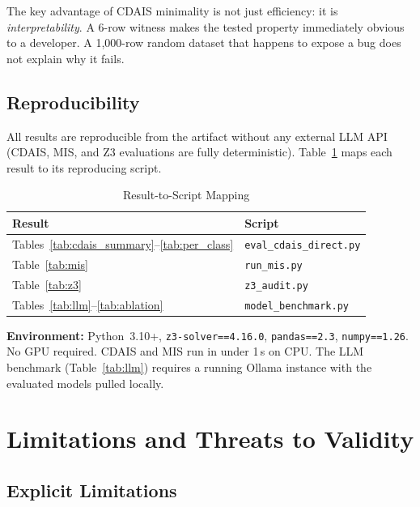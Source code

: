 \documentclass[conference]{IEEEtran}
\begin{document}
The key advantage of CDAIS minimality is not just efficiency: it is
\emph{interpretability}. A 6-row witness makes the tested property immediately obvious
to a developer. A 1,000-row random dataset that happens to expose a bug does not
explain why it fails.

\subsection{Reproducibility}

All results are reproducible from the artifact without any external LLM API (CDAIS,
MIS, and Z3 evaluations are fully deterministic). Table~\ref{tab:repro} maps each
result to its reproducing script.

\begin{table}[t]
  \caption{Result-to-Script Mapping}
  \label{tab:repro}
  \centering
  \scriptsize
  \begin{tabularx}{\columnwidth}{@{}l X@{}}
    \toprule
    \textbf{Result} & \textbf{Script} \\
    \midrule
    Tables~\ref{tab:cdais_summary}--\ref{tab:per_class}
      & \texttt{eval\_cdais\_direct.py} \\
    Table~\ref{tab:mis}
      & \texttt{run\_mis.py} \\
    Table~\ref{tab:z3}
      & \texttt{z3\_audit.py} \\
    Tables~\ref{tab:llm}--\ref{tab:ablation}
      & \texttt{model\_benchmark.py} \\
    \bottomrule
  \end{tabularx}
\end{table}

\textbf{Environment:} Python~3.10+, \texttt{z3-solver==4.16.0}, \texttt{pandas==2.3},
\texttt{numpy==1.26}. No GPU required. CDAIS and MIS run in under 1\,s on CPU. The
LLM benchmark (Table~\ref{tab:llm}) requires a running Ollama instance with the
evaluated models pulled locally.


\section{Limitations and Threats to Validity}

\subsection{Explicit Limitations}
\end{document}
